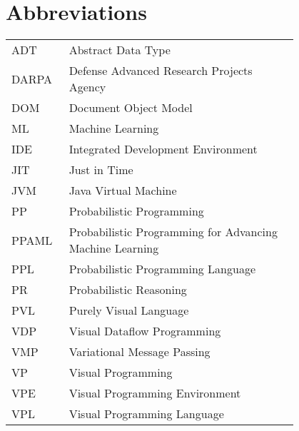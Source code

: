 \chapter*{Abbreviations}

\begin{flushleft}
\begin{tabular}{l p{0.8\linewidth}}
ADT      & Abstract Data Type\\
DARPA    & Defense Advanced Research Projects Agency\\
DOM      & Document Object Model\\
ML       & Machine Learning\\
IDE      & Integrated Development Environment\\
JIT      & Just in Time\\
JVM      & Java Virtual Machine\\
PP       & Probabilistic Programming\\
PPAML    & Probabilistic Programming for Advancing Machine Learning\\
PPL      & Probabilistic Programming Language\\
PR       & Probabilistic Reasoning\\
PVL      & Purely Visual Language\\
VDP      & Visual Dataflow Programming\\
VMP      & Variational Message Passing\\
VP       & Visual Programming\\
VPE      & Visual Programming Environment\\
VPL      & Visual Programming Language
\end{tabular}
\end{flushleft}
